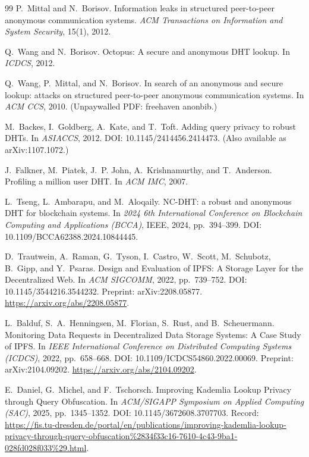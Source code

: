 \documentclass[11pt]{article}
\begin{document}
\begin{thebibliography}{99}
P.~Mittal and N.~Borisov.
\newblock Information leaks in structured peer-to-peer anonymous communication systems.
\newblock \emph{ACM Transactions on Information and System Security}, 15(1), 2012.

Q.~Wang and N.~Borisov.
\newblock Octopus: A secure and anonymous DHT lookup.
\newblock In \emph{ICDCS}, 2012.

Q.~Wang, P.~Mittal, and N.~Borisov.
\newblock In search of an anonymous and secure lookup: attacks on structured peer-to-peer anonymous communication systems.
\newblock In \emph{ACM CCS}, 2010. (Unpaywalled PDF: freehaven anonbib.)

M.~Backes, I.~Goldberg, A.~Kate, and T.~Toft.
\newblock Adding query privacy to robust DHTs.
\newblock In \emph{ASIACCS}, 2012.
\newblock DOI: 10.1145/2414456.2414473.
\newblock (Also available as arXiv:1107.1072.)

J.~Falkner, M.~Piatek, J.~P. John, A.~Krishnamurthy, and T.~Anderson.
\newblock Profiling a million user DHT.
\newblock In \emph{ACM IMC}, 2007.

L.~Tseng, L.~Ambarapu, and M.~Aloqaily.
\newblock NC-DHT: a robust and anonymous DHT for blockchain systems.
\newblock In \emph{2024 6th International Conference on Blockchain Computing and Applications (BCCA)}, IEEE, 2024, pp.~394--399.
\newblock DOI: 10.1109/BCCA62388.2024.10844445.

D.~Trautwein, A.~Raman, G.~Tyson, I.~Castro, W.~Scott, M.~Schubotz, B.~Gipp, and Y.~Psaras.
\newblock Design and Evaluation of {IPFS}: A Storage Layer for the Decentralized Web.
\newblock In \emph{ACM SIGCOMM}, 2022, pp.~739--752.
\newblock DOI: 10.1145/3544216.3544232.
\newblock Preprint: arXiv:2208.05877.
\newblock \url{https://arxiv.org/abs/2208.05877}.


L.~Balduf, S.~A.~Henningsen, M.~Florian, S.~Rust, and B.~Scheuermann.
\newblock Monitoring Data Requests in Decentralized Data Storage Systems: A Case Study of {IPFS}.
\newblock In \emph{IEEE International Conference on Distributed Computing Systems (ICDCS)}, 2022, pp.~658--668.
\newblock DOI: 10.1109/ICDCS54860.2022.00069.
\newblock Preprint: arXiv:2104.09202.
\newblock \url{https://arxiv.org/abs/2104.09202}.

E.~Daniel, G.~Michel, and F.~Tschorsch.
\newblock Improving {Kademlia} Lookup Privacy through Query Obfuscation.
\newblock In \emph{ACM/SIGAPP Symposium on Applied Computing (SAC)}, 2025, pp.~1345--1352.
\newblock DOI: 10.1145/3672608.3707703.
\newblock Record: \url{https://fis.tu-dresden.de/portal/en/publications/improving-kademlia-lookup-privacy-through-query-obfuscation%2834f33c16-7610-4c43-9ba1-028fd028f033%29.html}.



\end{thebibliography}
\end{document}

